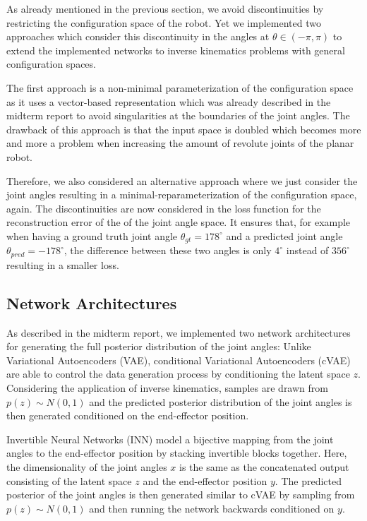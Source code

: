 \documentclass[conference]{IEEEtran}
\begin{document}
As already mentioned in the previous section, we avoid discontinuities by restricting the configuration space of the robot. Yet we implemented two approaches which consider this discontinuity in the angles at $\theta \in (- \pi , \pi)$ to extend the implemented networks to inverse kinematics problems with general configuration spaces.

The first approach is a non-minimal parameterization of the configuration space as it uses a vector-based representation which was already described in the midterm report to avoid singularities at the boundaries of the joint angles. The drawback of this approach is that the input space is doubled which becomes more and more a problem when increasing the amount of revolute joints of the planar robot.

Therefore, we also considered an alternative approach where we just consider the joint angles resulting in a minimal-reparameterization of the configuration space, again. The discontinuities are now considered in the loss function for the reconstruction error of the of the joint angle space. It ensures that, for example when having a ground truth joint angle $\theta _{gt} = 178^\circ$ and a predicted joint angle $\theta _{pred} = -178^\circ$, the difference between these two angles is only $4^\circ$ instead of $356^\circ$ resulting in a smaller loss.

\subsection*{Network Architectures}

As described in the midterm report, we implemented two network architectures for generating the full posterior distribution of the joint angles: Unlike Variational Autoencoders (VAE), conditional Variational Autoencoders (cVAE) are able to control the data generation process by conditioning the latent space $z$. Considering the application of inverse kinematics,  samples are drawn from $p(z) \sim N(0, 1)$ and the predicted posterior distribution of the joint angles is then generated conditioned on the end-effector position.

Invertible Neural Networks (INN) model a bijective mapping from the joint angles to the end-effector position by stacking invertible blocks together. Here, the dimensionality of the joint angles $x$ is the same as the concatenated output consisting of the latent space $z$ and the end-effector position $y$. The predicted posterior of the joint angles is then generated similar to cVAE by sampling from $p(z) \sim N(0, 1)$ and then running the network backwards conditioned on $y$.
\end{document}
